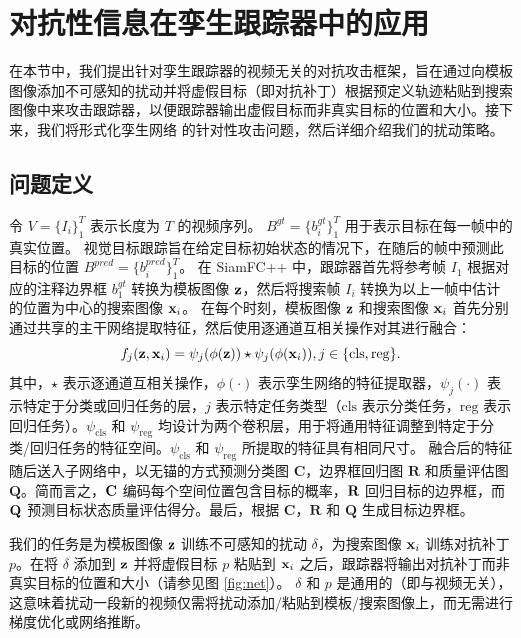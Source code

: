 \section{对抗性信息在孪生跟踪器中的应用}
在本节中，我们提出针对孪生跟踪器的视频无关的对抗攻击框架，旨在通过向模板图像添加不可感知的扰动并将虚假目标（即对抗补丁）根据预定义轨迹粘贴到搜索图像中来攻击跟踪器，以便跟踪器输出虚假目标而非真实目标的位置和大小。接下来，我们将形式化孪生网络 \cite{SiamFC++} 的针对性攻击问题，然后详细介绍我们的扰动策略。

\subsection{问题定义}
令 $V=\{I_i\}_1^T$ 表示长度为 $T$ 的视频序列。
$B^{gt}=\{b^{gt}_i\}_1^T$ 用于表示目标在每一帧中的真实位置。
视觉目标跟踪旨在给定目标初始状态的情况下，在随后的帧中预测此目标的位置 $B^{pred}=\{b^{pred}_i\}_1^T$。
在 SiamFC++ 中，跟踪器首先将参考帧 $I_1$ 根据对应的注释边界框 $b_1^{gt}$ 转换为模板图像 $\textbf z$，然后将搜索帧 $I_i$ 转换为以上一帧中估计的位置为中心的搜索图像 $\textbf x_i$。
在每个时刻，模板图像 $\textbf z$ 和搜索图像 $\textbf x_i$ 首先分别通过共享的主干网络提取特征，然后使用逐通道互相关操作对其进行融合：
\begin{equation}
f_{j}(\textbf z, \textbf x_i)=\psi_{j}(\phi(\textbf z)) \star \psi_{j}(\phi(\textbf x_i)), j \in\{\mathrm{cls}, \mathrm{reg}\}.
\end{equation}
其中，$\star$ 表示逐通道互相关操作，$\phi(\cdot)$ 表示孪生网络的特征提取器，$\psi_j(\cdot)$ 表示特定于分类或回归任务的层，$j$ 表示特定任务类型（$\mathrm{cls}$ 表示分类任务，$\mathrm{reg}$ 表示回归任务）。$\psi_{\mathrm{cls}}$ 和 $\psi_{\mathrm{reg}}$ 均设计为两个卷积层，用于将通用特征调整到特定于分类/回归任务的特征空间。$\psi_{\mathrm{cls}}$ 和 $\psi_{\mathrm{reg}}$ 所提取的特征具有相同尺寸。
融合后的特征随后送入子网络中，以无锚的方式预测分类图 $\textbf{C}$，边界框回归图 $\textbf{R}$ 和质量评估图 $\textbf{Q}$。简而言之，$\textbf C$ 编码每个空间位置包含目标的概率，$\textbf R$ 回归目标的边界框，而 $\textbf Q$ 预测目标状态质量评估得分。最后，根据 $\textbf{C}$，$\textbf{R}$ 和 $\textbf{Q}$ 生成目标边界框。

我们的任务是为模板图像 $\textbf z$ 训练不可感知的扰动 $\delta$，为搜索图像 $\textbf x_i$ 训练对抗补丁 $p$。在将 $\delta$ 添加到 $\textbf z$ 并将虚假目标 $p$ 粘贴到 $\textbf x_i$ 之后，跟踪器将输出对抗补丁而非真实目标的位置和大小（请参见图 \ref{fig:net}）。
$\delta$ 和 $p$ 是通用的（即与视频无关），这意味着扰动一段新的视频仅需将扰动添加/粘贴到模板/搜索图像上，而无需进行梯度优化或网络推断。

